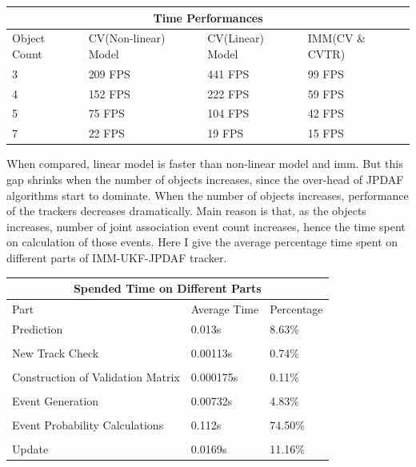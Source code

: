 \documentclass[peerreview]{IEEEtran}
\begin{document}
\begin{center}
\begin{tabular}{ |p{1cm}||p{2cm}|p{1.8cm}| p{1.8cm}| }
 \hline
 \multicolumn{4}{|c|}{Time Performances} \\
 \hline
 Object Count & CV(Non-linear) Model & CV(Linear) Model & IMM(CV \& CVTR)\\
 \hline
 
 3   & 209 FPS    &441 FPS& 99 FPS  \\
 4   & 152 FPS    &222 FPS& 59 FPS  \\
 5   & 75 FPS    &104 FPS& 42 FPS  \\
 7   & 22 FPS    &19 FPS& 15 FPS  \\
 
 \hline
\end{tabular}

\end{center}

\label{tbl:Tracker Performances Table}
\vspace{10px}
When compared, linear model is faster than non-linear model and imm. But this gap shrinks when the number of objects increases, since the over-head of JPDAF algorithms start to dominate. When the number of objects increases, performance of the trackers decreases dramatically. Main reason is that, as the objects increases, number of joint association event count increases, hence the time spent on calculation of those events. Here I give the average percentage time spent on different parts of IMM-UKF-JPDAF tracker.

\vspace{10px}
\begin{center}
\begin{tabular}{ |p{3cm}||p{1.8cm}| p{1.8cm}| }
 \hline
 \multicolumn{3}{|c|}{Spended Time on Different Parts} \\
 \hline
 Part& Average Time & Percentage\\
 \hline
 
 Prediction   & 0.013s & 8.63\%   \\ \\
 New Track Check   & 0.00113s & 0.74\%  \\\\
 Construction of Validation Matrix   & 0.000175s & 0.11\%   \\\\
 Event Generation   & 0.00732s & 4.83\%  \\\\
 Event Probability Calculations   & 0.112s & 74.50\%  \\\\
 Update   & 0.0169s & 11.16\%   \\
 
 
 \hline
\end{tabular}

\end{center}
\end{document}
